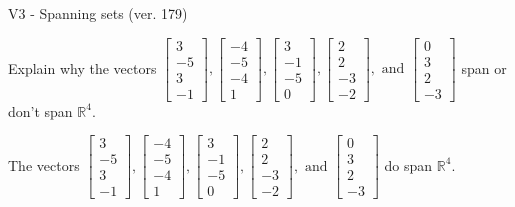 \begin{exercise}
  \begin{exerciseTitle}V3 - Spanning sets (ver. 179)\end{exerciseTitle}
  \begin{exerciseStatement}
    Explain why the vectors \(\left[\begin{array}{r}
3 \\
-5 \\
3 \\
-1
\end{array}\right] , \left[\begin{array}{r}
-4 \\
-5 \\
-4 \\
1
\end{array}\right] , \left[\begin{array}{r}
3 \\
-1 \\
-5 \\
0
\end{array}\right] , \left[\begin{array}{r}
2 \\
2 \\
-3 \\
-2
\end{array}\right] , \text{ and } \left[\begin{array}{r}
0 \\
3 \\
2 \\
-3
\end{array}\right]\) span or don't span \(\mathbb{R}^4\). 
	


  \end{exerciseStatement}
  \begin{exerciseAnswer}
   The vectors \(\left[\begin{array}{r}
3 \\
-5 \\
3 \\
-1
\end{array}\right] , \left[\begin{array}{r}
-4 \\
-5 \\
-4 \\
1
\end{array}\right] , \left[\begin{array}{r}
3 \\
-1 \\
-5 \\
0
\end{array}\right] , \left[\begin{array}{r}
2 \\
2 \\
-3 \\
-2
\end{array}\right] , \text{ and } \left[\begin{array}{r}
0 \\
3 \\
2 \\
-3
\end{array}\right]\) 
  	 do  
	span \(\mathbb{R}^4\).
  



\end{exerciseAnswer}
\end{exercise}
